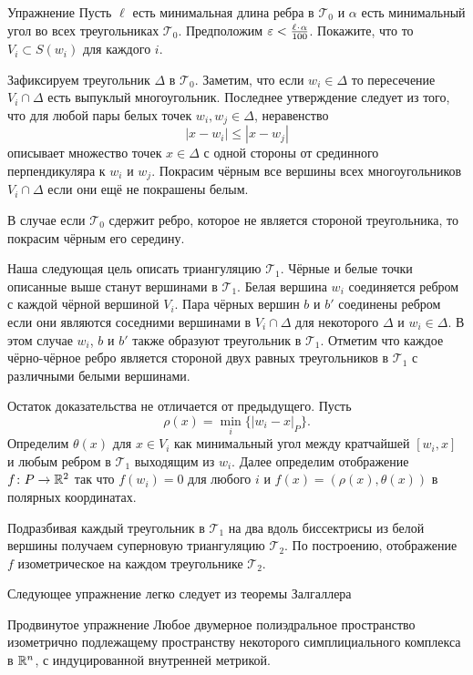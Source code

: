 \begin{thm}{Упражнение}\label{ex:voronoi-in-star}
Пусть $\ell$ есть минимальная длина ребра в $\mathcal{T}_0$
и $\alpha$ есть минимальный угол во всех треугольниках $\mathcal{T}_0$.
Предположим $\eps<\tfrac{\ell\cdot \alpha}{100}$.
Покажите, что 
то $V_i\subset S(w_i)$ для каждого $i$.
\end{thm}

Зафиксируем треугольник $\Delta$ в $\mathcal{T}_0$.
Заметим, что если $w_i\in \Delta$ то пересечение $V_i\cap \Delta$ есть выпуклый многоугольник.
Последнее утверждение следует из того, 
что для любой пары белых точек  $w_i,w_j\in\Delta$,
неравенство 
$$|x-w_i|\le |x-w_j|$$ 
описывает множество точек $x \in \Delta$
с одной стороны от срединного перпендикуляра к $w_i$ и $w_j$.
Покрасим чёрным все вершины всех многоугольников  $V_i\cap \Delta$ если они ещё не покрашены белым.

В случае если $\mathcal{T}_0$ 
сдержит ребро, которое не является стороной треугольника,
то покрасим чёрным его середину.  

Наша следующая цель описать триангуляцию $\mathcal{T}_1$.  
Чёрные и белые точки описанные выше станут вершинами в $\mathcal{T}_1$.
Белая вершина $w_i$ соединяется ребром с каждой чёрной вершиной $V_i$.
Пара чёрных вершин $b$ и $b'$ соединены ребром если они являются соседними вершинами в $V_i\cap \Delta$ 
для некоторого $\Delta$ и $w_i\in\Delta$.
В этом случае $w_i$, $b$ и $b'$ также образуют треугольник в $\mathcal{T}_1$.  
Отметим что каждое чёрно-чёрное ребро является стороной двух равных треугольников в $\mathcal{T}_1$ с различными белыми вершинами.

Остаток доказательства не отличается от предыдущего.
Пусть
$$\rho(x)=\min_i\{|w_i-x|_P\}.$$
Определим $\theta(x)$ для $x\in V_i$ как минимальный угол между кратчайшей $[w_i,x]$ и любым ребром 
в $\mathcal{T}_1$ выходящим из $w_i$.
Далее определим отображение $f\colon P\to \mathbb{R}^2$ 
так что 
$f(w_i)=0$ для любого $i$ 
и
$f(x)=(\rho(x),\theta(x))$ в полярных координатах.

Подразбивая каждый треугольник в $\mathcal{T}_1$
на два вдоль биссектрисы из белой вершины получаем суперновую триангуляцию $\mathcal{T}_2$.
По построению, отображение  $f$ изометрическое на каждом треугольнике $\mathcal{T}_2$.
\qeds

Следующее упражнение легко следует из теоремы Залгаллера

\begin{thm}{Продвинутое упражнение}\label{ex:zalgalle+embedding}
Любое двумерное полиэдральное пространство изометрично подлежащему пространству некоторого симплициального комплекса  в $\mathbb{R}^n$, 
с индуцированной внутренней метрикой. 
\end{thm}

